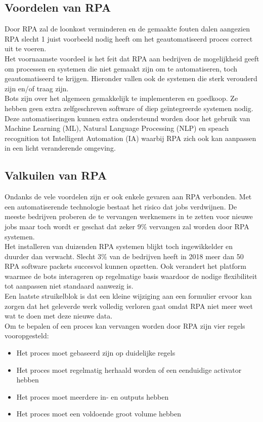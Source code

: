 \subsection{Voordelen van RPA}
Door RPA zal de loonkost verminderen en de gemaakte fouten dalen aangezien RPA slecht 1 juist voorbeeld nodig heeft om het geautomatiseerd proces correct uit te voeren.\\
Het voornaamste voordeel is het feit dat RPA aan bedrijven de mogelijkheid geeft om processen en systemen die niet gemaakt zijn om te automatiseren, toch geautomatiseerd te krijgen. Hieronder vallen ook de systemen die sterk verouderd zijn en/of  traag zijn. \\
Bots zijn over het algemeen gemakkelijk te implementeren en goedkoop. Ze hebben geen extra zelfgeschreven software of diep geïntegreerde systemen nodig.\\
Deze automatiseringen kunnen extra ondersteund worden door het gebruik van Machine Learning  (ML),  Natural Language Processing (NLP) en speach recognition tot  Intelligent Automation (IA) waarbij RPA zich ook kan aanpassen in een licht veranderende omgeving. \autocite{whatIsRPA}

\subsection{Valkuilen van RPA}
Ondanks de vele voordelen zijn er ook enkele gevaren aan RPA verbonden. Met een automatiserende technologie bestaat het risico dat jobs verdwijnen. De meeste bedrijven proberen de te vervangen werknemers in te zetten voor nieuwe jobs maar toch wordt er geschat dat zeker 9\% vervangen zal worden door RPA systemen.\\
Het installeren van duizenden RPA systemen blijkt toch ingewikkelder en duurder dan verwacht. Slecht 3\% van de bedrijven heeft in 2018 meer dan 50 RPA software packets succesvol kunnen opzetten. Ook verandert het platform waarmee de bots interageren op regelmatige basis waardoor de nodige flexibiliteit tot aanpassen niet standaard aanwezig is.\\
Een laatste struikelblok is dat een kleine wijziging aan een formulier ervoor  kan zorgen dat het geleverde werk volledig verloren gaat omdat RPA niet meer weet wat te doen met deze nieuwe data. \autocite{whatIsRPA}\\
\newline
Om te bepalen of een proces kan vervangen worden door RPA zijn vier regels vooropgesteld:
\begin{itemize}
	\item Het proces moet gebaseerd zijn op duidelijke regels
	\item Het proces moet regelmatig herhaald worden of een eenduidige activator hebben
	\item Het proces moet meerdere in- en outputs hebben
	\item Het proces moet een voldoende groot volume hebben
\end{itemize} \autocite{explainRPA}

